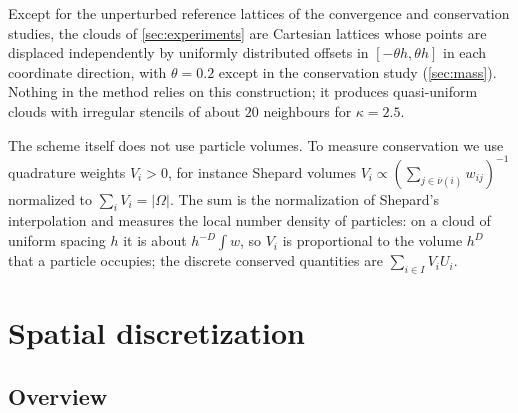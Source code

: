 \documentclass[smallextended]{svjour3}
\numberwithin{equation}{section}
\newcommand{\cnb}{\bar\nu}
\begin{document}
Except for the unperturbed reference lattices of the convergence and conservation studies, the clouds of \cref{sec:experiments} are Cartesian lattices whose points are displaced independently by uniformly distributed offsets in $[-\theta h,\theta h]$ in each coordinate direction, with $\theta=0.2$ except in the conservation study (\cref{sec:mass}). Nothing in the method relies on this construction; it produces quasi-uniform clouds with irregular stencils of about $20$ neighbours for $\kappa=2.5$.

The scheme itself does not use particle volumes. To measure conservation we use quadrature weights $V_i>0$, for instance Shepard volumes $V_i\propto(\sum_{j\in\cnb(i)}w_{ij})^{-1}$ normalized to $\sum_i V_i=|\Omega|$. The sum is the normalization of Shepard's interpolation \cite{Shepard1968} and measures the local number density of particles: on a cloud of uniform spacing $h$ it is about $h^{-D}\int w$, so $V_i$ is proportional to the volume $h^D$ that a particle occupies; the discrete conserved quantities are $\sum_{i\in I}V_iU_i$.

\section{Spatial discretization}\label{sec:method}

\subsection{Overview}\label{sec:overview}
\end{document}
